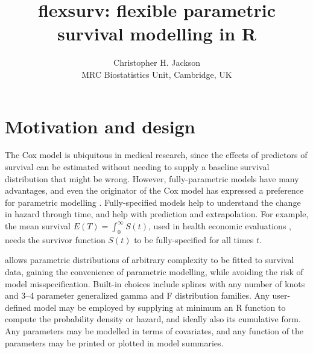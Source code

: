 \documentclass[nojss,nofooter]{jss}
\author{Christopher H. Jackson \\ MRC Biostatistics Unit, Cambridge, UK \\ \email{chris.jackson@mrc-bsu.cam.ac.uk}}
\title{flexsurv: flexible parametric survival modelling in R}
\begin{document}
\section{Motivation and design}

The Cox model is ubiquitous in medical research, since the effects of
predictors of survival can be estimated without needing to supply a
baseline survival distribution that might be wrong.  However,
fully-parametric models have many advantages, and even the originator
of the Cox model has expressed a preference for parametric modelling
\citep{reid:cox:conversation}.  Fully-specified models help to
understand the change in hazard through time, and help with prediction
and extrapolation. For example, the mean survival $E(T) =
\int_0^{\infty}S(t)$, used in health economic
evaluations \citep{latimer2013survival}, needs the survivor function
$S(t)$ to be fully-specified for all times $t$.


 allows parametric distributions of
arbitrary complexity to be fitted to survival data, gaining the
convenience of parametric modelling, while avoiding the risk of model
misspecification.  Built-in choices include splines with any number of
knots \citep{royston:parmar} and 3--4 parameter generalized gamma and
F distribution families.  Any user-defined model may be employed by
supplying at minimum an R function to compute the probability density
or hazard, and ideally also its cumulative form.  Any parameters may
be modelled in terms of covariates, and any function of the parameters
may be printed or plotted in model summaries.
\end{document}
